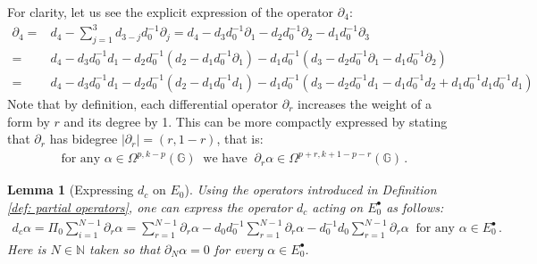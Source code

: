 \documentclass[dvipsnames]{amsart}
\newtheorem{lemma}[theorem]{Lemma}
\theoremstyle{definition}
\theoremstyle{definition}
\numberwithin{equation}{section}
\newcommand{\G}{\mathbb{G}}
\begin{document}
For clarity, let us see the explicit expression of the operator $\partial_4$:
\begin{align*}
    \partial_4=&d_4-\sum_{j=1}^3d_{3-j}d_0^{-1}\partial_j=d_4-d_3d_0^{-1}\partial_1-d_2d_0^{-1}\partial_2-d_1d_0^{-1}\partial_3\\=&d_4-d_3d_0^{-1}d_1-d_2d_0^{-1}\left(d_2-d_1d_0^{-1}\partial_1\right)-d_1d_0^{-1}\left(d_3-d_2d_0^{-1}\partial_1-d_1d_0^{-1}\partial_2\right)\\=&d_4-d_3d_0^{-1}d_1-d_2d_0^{-1}\left(d_2-d_1d_0^{-1}d_1\right)-d_1d_0^{-1}\left(d_3-d_2d_0^{-1}d_1-d_1d_0^{-1}d_2+d_1d_0^{-1}d_1d_0^{-1}d_1\right)
\end{align*}
Note that by definition, each differential operator $\partial_r$ increases the weight of a form by $r$ and its degree by 1. This can be more compactly expressed by stating that $\partial_r$ has bidegree $|\partial_r|=(r,1-r)$, that is:
\begin{align*}
    \text{ for any }\alpha\in\Omega^{p,k-p}(\G)\ \text{ we have }\ \partial_r\alpha\in\Omega^{p+r,k+1-p-r}(\G)\,.
\end{align*}
\begin{lemma}[Expressing $d_c$ on $E_0$]\label{lem: expressing d_c on E_0} Using the operators introduced in Definition \ref{def: partial operators}, one can express the operator $d_c$ acting on $E_0^\bullet$ as follows:
\begin{align}\label{eq: formula for d_c in terms of partials}
    d_c\alpha=\Pi_0\sum_{i=1}^{N-1}\partial_r\alpha=\sum_{r=1}^{N-1}\partial_r\alpha-d_0d_0^{-1}\sum_{r=1}^{N-1}\partial_r\alpha-d_0^{-1}d_0\sum_{r=1}^{N-1}\partial_r\alpha\ \text{ for any }\alpha\in E_0^\bullet\,.
\end{align}
Here is $N\in\mathbb{N}$ taken so that $\partial_N\alpha=0$ for every $\alpha\in E_0^\bullet$.
\end{lemma}
\end{document}
